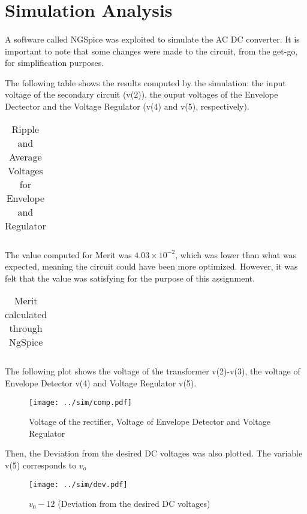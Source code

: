 \newpage{}

\section{Simulation Analysis}
\label{sec:simulation}
\paragraph{}


\par A software called NGSpice was exploited to simulate the AC DC converter. It is important to note that some changes were made to the circuit, from the get-go, for simplification purposes. 
\par The following table shows the results computed by the simulation: the input voltage of the secondary circuit (v(2)), the ouput voltages of the Envelope Dectector and the Voltage Regulator (v(4) and v(5), respectively).


\begin{table}[H]
  \centering
  \begin{tabular}{|c|c|}
    \hline    
    
  \end{tabular}
  \caption{Ripple and Average Voltages for Envelope and Regulator}
  \label{sim1}
\end{table}

\par The value computed for Merit was $4.03\times 10^{-2}$, which was lower than what was expected, meaning the circuit could have been more optimized. However, it was felt that the value was satisfying for the purpose of this assignment.

\begin{table}[H]
  \centering
  \begin{tabular}{|c|c|}
    \hline    
    
  \end{tabular}
  \caption{Merit calculated through NgSpice}
  \label{sim1}
\end{table}

\par The following plot shows the voltage of the transformer v(2)-v(3), the voltage of Envelope Detector v(4) and Voltage Regulator v(5).

\begin{figure}[H]
    \texttt{[image: ../sim/comp.pdf]}
    \centering
    \caption{Voltage of the rectifier, Voltage of Envelope Detector and Voltage Regulator}
    \label{mag}
\end{figure}
\par Then, the Deviation from the desired DC voltages was also plotted. The variable v(5) corresponds to $v_o$
\begin{figure}[H]
    \texttt{[image: ../sim/dev.pdf]}
    \centering
    \caption{$v_0-12$ (Deviation from the desired DC voltages)}
    \label{mag}
\end{figure}

\newpage{}

